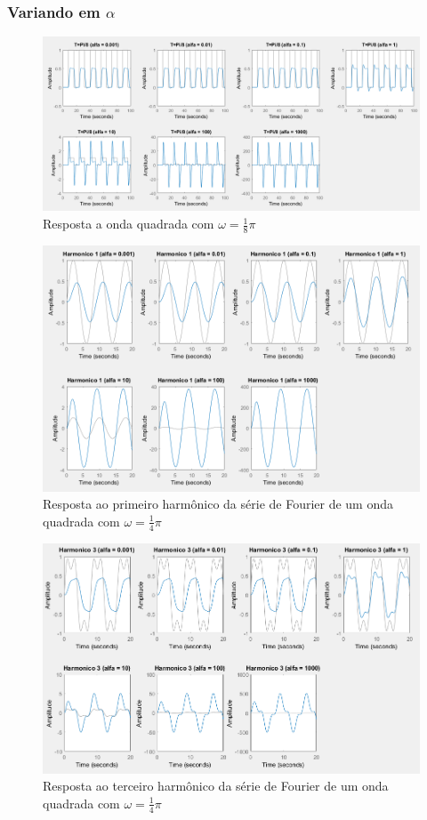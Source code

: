 \documentclass[a4paper, 12pt]{article}
\begin{document}
			\subsubsection{Variando em $\alpha$}
			\begin{figure}[!ht]
				\centering
				\includegraphics[scale=0.4]{img/3f_alfa.png}
				\caption{Resposta a onda quadrada com $\omega = \frac{1}{8}\pi$}
			\end{figure}
			\begin{figure}[!ht]
				\centering
				\includegraphics[scale=0.5]{img/3g_alfa.png}
				\caption{Resposta ao primeiro harmônico da série de Fourier de um onda quadrada com $\omega = \frac{1}{4}\pi$}
			\end{figure}
			\begin{figure}[!ht]
				\centering
				\includegraphics[scale=0.5]{img/3h_alfa.png}
				\caption{Resposta ao terceiro harmônico da série de Fourier de um onda quadrada com $\omega = \frac{1}{4}\pi$}
			\end{figure}
\end{document}
